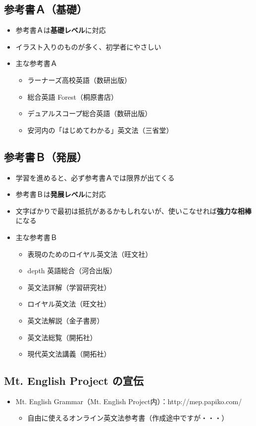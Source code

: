 \documentclass[12pt,titlepage]{jsarticle}
\begin{document}
  \subsection*{参考書Ａ（基礎）}
  \begin{itemize}
   \item 参考書Ａは{\bf 基礎レベル}に対応
   \item イラスト入りのものが多く、初学者にやさしい
   \item 主な参考書Ａ
         \begin{itemize}
          \item ラーナーズ高校英語（数研出版）
          \item 総合英語 Forest（桐原書店）
          \item デュアルスコープ総合英語（数研出版）
          \item 安河内の「はじめてわかる」英文法（三省堂）
         \end{itemize}
  \end{itemize}

  \subsection*{参考書Ｂ（発展）}
  \begin{itemize}
   \item 学習を進めると、必ず参考書Ａでは限界が出てくる
   \item 参考書Ｂは{\bf 発展レベル}に対応
   \item 文字ばかりで最初は抵抗があるかもしれないが、使いこなせれば{\bf 強力な相棒}になる
   \item 主な参考書Ｂ
         \begin{itemize}
          \item 表現のためのロイヤル英文法（旺文社）
          \item depth 英語総合（河合出版）
          \item 英文法詳解（学習研究社）
          \item ロイヤル英文法（旺文社）
          \item 英文法解説（金子書房）
          \item 英文法総覧（開拓社）
          \item 現代英文法講義（開拓社）
         \end{itemize}
  \end{itemize}
  \subsection*{Mt. English Project の宣伝}
  \begin{itemize}
   \item Mt. English Grammar（Mt. English Project内）：http://mep.papiko.com/
         \begin{itemize}
          \item 自由に使えるオンライン英文法参考書（作成途中ですが・・・）
         \end{itemize}
  \end{itemize}
\end{document}
